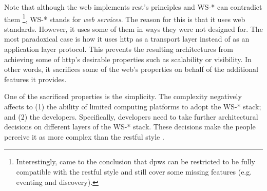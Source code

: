 Note that although the web implements \ac{rest}'s principles and WS-* can contradict them
\footnote{Interestingly, \citet{moritz_devices_2010} came to the conclusion that \ac{dpws} can be restricted to be fully compatible with the \ac{rest}ful style and still cover some missing features (e.g. eventing and discovery).},
WS-* stands for \emph{web services}. %
The reason for this is that it uses web standards. %
However, it uses some of them in  ways they were not designed for.
The most paradoxical case is how it uses \ac{http} as a transport layer instead of as an application layer protocol.
This prevents the resulting architectures from achieving some of \ac{http}'s desirable properties such as scalability or visibility.
In other words, it sacrifices some of the web's properties on behalf of the additional features it provides.


One of the sacrificed properties is the simplicity.
The complexity negatively affects to
(1) the ability of limited computing platforms to adopt the WS-* stack; and %
(2) the developers.
Specifically, developers need to take further architectural decisions on different layers of the WS-* stack.
These decisions make the people perceive it as more complex than the \ac{rest}ful style \citep{guinard_search_2011}.


